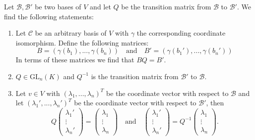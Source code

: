         \begin{property}\label{linalgebra:theorem:transition_matrix}
		Let $\mathcal{B}, \mathcal{B}'$ be two bases of $V$ and let $Q$ be the transition matrix from $\mathcal{B}$ to $\mathcal{B}'$. We find the following statements:
	        \begin{enumerate}
			\item Let $\mathcal{C}$ be an arbitrary basis of $V$ with $\gamma$ the corresponding coordinate isomorphism. Define the following matrices:
        	        	\[
        	        		B=(\gamma(b_1), ..., \gamma(b_n))\quad\text{and}\quad B'=(\gamma(b_1'), ..., \gamma(b_n'))
        	        	\]
		                In terms of these matrices we find that $BQ = B'$.
			\item $Q\in\text{GL}_n(K)$ and $Q^{-1}$ is the transition matrix from $\mathcal{B}'$ to $\mathcal{B}$.
                	\item Let $v\in V$ with $(\lambda_1, ..., \lambda_n)^T$ be the coordinate vector with respect to $\mathcal{B}$ and let $(\lambda_1', ..., \lambda_n')^T$ be the coordinate vector with respect to $\mathcal{B}'$, then
                	\[
		                Q\left(
				\begin{array}{c}
					\lambda_1'\\
                			\vdots\\
			        	\lambda_n'
				\end{array}
                        	\right)
                        	=
		                \left(
                		\begin{array}{c}
					\lambda_1\\
                			\vdots\\
			        	\lambda_n
				\end{array}
                        	\right)
				\quad\text{and}\quad
                        	\left(
                        	\begin{array}{c}
					\lambda_1'\\
                        		\vdots\\
			        	\lambda_n'
				\end{array}
		                \right)
                	        =
                	        Q^{-1}\left(
                	        \begin{array}{c}
					\lambda_1\\
                		        \vdots\\
			                \lambda_n
				\end{array}
                        	\right).
			\]
		\end{enumerate}
	\end{property}
        
